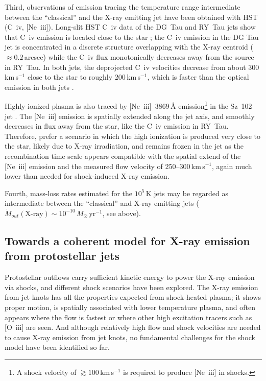 \documentclass[graybox, nosecnum]{svmult}
\begin{document}
Third, observations of emission tracing the temperature range intermediate between the ``classical''  and the X-ray emitting jet have been obtained with HST (C~{\sc iv}, [Ne~{\sc iii}]). Long-slit HST C~{\sc iv} data of the DG~Tau and RY~Tau  jets show that C~{\sc iv} emission is located close to the star \cite{Schneider_2013a, Skinner_2018}; the C~{\sc iv} emission in the DG Tau jet is concentrated in a discrete structure overlapping with the X-ray centroid ($\approx0.2$\,arcsec)  while 
the C~{\sc iv} flux monotonically decreases away from the source in RY~Tau. In both jets, the deprojected C~{\sc iv} velocities decrease from about 300\,km\,s$^{-1}$ close to the star to roughly 200\,km\,s$^{-1}$, which is faster than the optical emission in both jets \cite{Schneider_2013a, Skinner_2018}.

Highly ionized plasma is also traced by [Ne~{\sc iii}]~$3869\,$\AA{} emission\footnote{A shock velocity of $\gtrsim100\,$km\,s$^{-1}$ is required to produce [Ne~{\sc iii}] in shocks.} in the Sz~102 jet \citep{Liu_2021}. The [Ne~{\sc iii}] emission is spatially extended along the jet axis, and smoothly decreases in flux away from the star, like the C~{\sc iv} emission in RY~Tau. Therefore, \citet{Liu_2021} prefer a scenario in which the high ionization is produced very close to the star, likely due to X-ray irradiation,  and remains frozen in the jet as the recombination time scale appears compatible with the spatial extend of the [Ne~{\sc iii}] emission and the measured flow velocity of 250--300\,km\,s$^{-1}$, again much lower than needed for shock-induced X-ray emission.

Fourth, mass-loss rates estimated for the $10^5$\,K jets \citep[$\sim10^{-9}\,M_\odot$\,yr$^{-1}$,][]{Schneider_2013a} may be regarded as intermediate between the ``classical'' \citep[$\sim10^{-8}\,M_\odot$\,yr$^{-1}$, e.g., ][]{Bacciotti_2000} and X-ray emitting jets ($\dot{M}_{out}(\textrm{X-ray})\sim10^{-10}\,M_\odot$\,yr$^{-1}$, see above). 

\subsection{Towards a coherent model for X-ray emission from protostellar jets}
Protostellar outflows carry sufficient kinetic energy to power the X-ray emission via shocks, and different shock scenarios have been explored. 
The X-ray emission from jet knots has all the properties expected from shock-heated plasma; it shows proper motion, is spatially associated with lower temperature plasma, and often appears where the flow is fastest or where other high excitation tracers such as [O~{\sc iii}] are seen. And although relatively high flow and shock velocities are needed to cause X-ray emission from jet knots, no fundamental challenges for the shock model have been identified so far.
\end{document}
